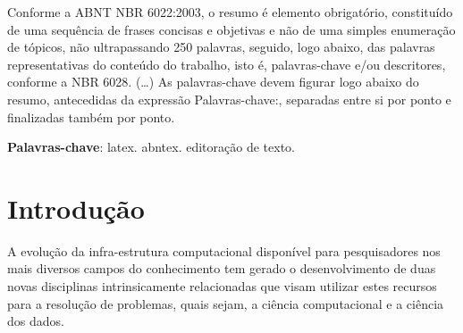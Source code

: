 \documentclass[
	article,			%
	11pt,				%
	oneside,			%
	a4paper,			%
	english,			%
	brazil,				%
	sumario=tradicional
	]{abntex2}
\begin{document}

\frenchspacing 


%
%
\maketitle

\begin{resumoumacoluna}
 Conforme a ABNT NBR 6022:2003, o resumo é elemento obrigatório, constituído de
 uma sequência de frases concisas e objetivas e não de uma simples enumeração
 de tópicos, não ultrapassando 250 palavras, seguido, logo abaixo, das palavras
 representativas do conteúdo do trabalho, isto é, palavras-chave e/ou
 descritores, conforme a NBR 6028. (\ldots) As palavras-chave devem figurar logo
 abaixo do resumo, antecedidas da expressão Palavras-chave:, separadas entre si por
 ponto e finalizadas também por ponto.
 
 \vspace{\onelineskip}
 
 \noindent
 \textbf{Palavras-chave}: latex. abntex. editoração de texto.
\end{resumoumacoluna}


\textual

\section*{Introdução}
A evolução da infra-estrutura computacional disponível para pesquisadores nos mais diversos campos do conhecimento tem gerado o desenvolvimento de duas novas disciplinas intrinsicamente relacionadas que visam utilizar estes recursos para a resolução de problemas, quais sejam, a ciência computacional e a ciência dos dados.
\end{document}
